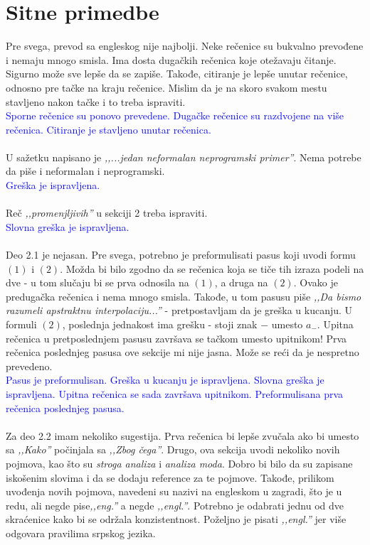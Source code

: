 \documentclass[a4paper]{report}
\newcommand{\odgovor}[1]{\textcolor{blue}{#1}}
\begin{document}
\section{Sitne primedbe}
Pre svega, prevod sa engleskog nije najbolji. Neke rečenice su bukvalno prevođene i nemaju mnogo smisla. Ima dosta dugačkih rečenica koje otežavaju čitanje. Sigurno može sve lepše da se zapiše. Takođe, citiranje je lepše unutar rečenice, odnosno pre tačke na kraju rečenice. Mislim da je na skoro svakom mestu stavljeno nakon tačke i to treba ispraviti.
\\
\odgovor{Sporne rečenice su ponovo prevedene. Dugačke rečenice su razdvojene na više rečenica. Citiranje je stavljeno unutar rečenica.}
\\
\\
U sažetku napisano je \textit{‚‚...jedan neformalan neprogramski primer''}. Nema potrebe da piše i neformalan i neprogramski.
\\
\odgovor{Greška je ispravljena.}
\\
\\
Reč \textit{‚‚promenjljivih''} u sekciji 2 treba ispraviti.
\\
 \odgovor{Slovna greška je ispravljena.}
\\
\\
Deo 2.1 je nejasan. Pre svega, potrebno je preformulisati pasus koji uvodi formu $(1)$ i $(2)$. Možda bi bilo zgodno da se rečenica koja se tiče tih izraza podeli na dve - u tom slučaju bi se prva odnosila na $(1)$, a druga na $(2)$. Ovako je predugačka rečenica i nema mnogo smisla. Takođe, u tom pasusu piše \textit{‚‚Da bismo razumeli apstraktnu interpolaciju...''} - pretpostavljam da je greška u kucanju. U formuli $(2)$, poslednja jednakost ima grešku - stoji znak $-$ umesto $a_-$. Upitna rečenica u pretposlednjem pasusu završava se tačkom umesto upitnikom! Prva rečenica poslednjeg pasusa ove sekcije mi nije jasna. Može se reći da je nespretno prevedeno. 
\\
 \odgovor{Pasus je preformulisan. Greška u kucanju je ispravljena. Slovna greška je ispravljena. Upitna rečenica se sada završava upitnikom. Preformulisana prva rečenica poslednjeg pasusa.} 
\\
\\
Za deo 2.2 imam nekoliko sugestija. Prva rečenica bi lepše zvučala ako bi umesto sa \textit{‚‚Kako''} počinjala sa \textit{‚‚Zbog čega''}. Drugo, ova sekcija uvodi nekoliko novih pojmova, kao što su \textit{stroga analiza} i \textit{analiza moda}. Dobro bi bilo da su zapisane iskošenim slovima i da se dodaju reference za te pojmove. Takođe, prilikom uvođenja novih pojmova, navedeni su nazivi na engleskom u zagradi, što je u redu, ali negde pise\textit{‚‚eng.''} a negde \textit{‚‚engl.''}. Potrebno je odabrati jednu od dve skraćenice kako bi se održala konzistentnost. Poželjno je pisati \textit{‚‚engl.''} jer više odgovara pravilima srpskog jezika. 
\end{document}
